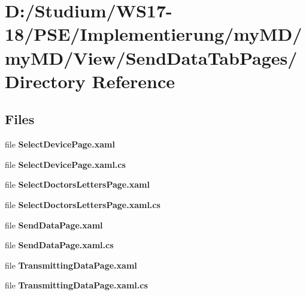 \hypertarget{dir_D_3A_2FStudium_2FWS17_2D18_2FPSE_2FImplementierung_2FmyMD_2FmyMD_2FView_2FSendDataTabPages_2F}{
\section{D:/Studium/WS17-18/PSE/Implementierung/my\-MD/my\-MD/View/Send\-Data\-Tab\-Pages/ Directory Reference}
\label{dir_D_3A_2FStudium_2FWS17_2D18_2FPSE_2FImplementierung_2FmyMD_2FmyMD_2FView_2FSendDataTabPages_2F}
}


\subsection*{Files}
\begin{CompactItemize}
\item 
file {\bf Select\-Device\-Page.xaml}
\item 
file {\bf Select\-Device\-Page.xaml.cs}
\item 
file {\bf Select\-Doctors\-Letters\-Page.xaml}
\item 
file {\bf Select\-Doctors\-Letters\-Page.xaml.cs}
\item 
file {\bf Send\-Data\-Page.xaml}
\item 
file {\bf Send\-Data\-Page.xaml.cs}
\item 
file {\bf Transmitting\-Data\-Page.xaml}
\item 
file {\bf Transmitting\-Data\-Page.xaml.cs}
\end{CompactItemize}
